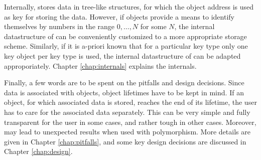 Internally, {\ViennaData} stores data in tree-like structures, for which the object address is used as key for storing the data.
However, if objects provide a means to identify themselves by numbers in the range $0, \ldots, N$ for some $N$, the internal datastructure of {\ViennaData} can be
conveniently customized to a more appropriate storage scheme. Similarly, if it is a-priori known that for a particular key type only one key object per key type is used, the
internal datastructure of {\ViennaData} can be adapted approporiately. Chapter \ref{chap:internals} explains the internals.

Finally, a few words are to be spent on the pitfalls and design decisions. Since data is associated with objects, object lifetimes have to be kept in mind.
If an object, for which associated data is stored, reaches the end of its lifetime, the user has to care for the associated data separately.
This can be very simple and fully transparent for the user in some cases, and rather tough in other cases. Moreover, {\ViennaData} may lead to unexpected results when used with polymorphism. More details are given in Chapter \ref{chap:pitfalls}, and some key design decisions are discussed in Chapter \ref{chap:design}.
